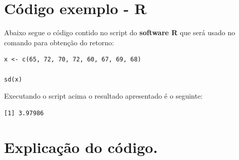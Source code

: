 \documentclass[14pt, a4paper]{article}
\begin{document}
\section{Código exemplo - R}

Abaixo segue o código contido no script do \textbf{software R} que será usado no comando para obtenção do retorno:

\begin{lstlisting}
x <- c(65, 72, 70, 72, 60, 67, 69, 68)
 
sd(x)
\end{lstlisting}

Executando o script acima o resultado apresentado é o seguinte:

\begin{lstlisting}
[1] 3.97986
\end{lstlisting}

\section{Explicação do código.}
\end{document}
